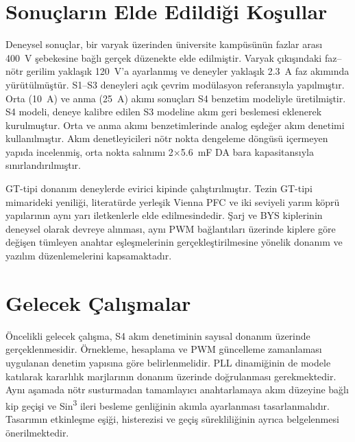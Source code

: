\section{Sonuçların Elde Edildiği Koşullar}
\label{sec:sonuc-kosullar}

Deneysel sonuçlar, bir varyak üzerinden üniversite kampüsünün fazlar arası \SI{400}{\volt} şebekesine bağlı gerçek düzenekte elde edilmiştir. Varyak çıkışındaki faz--nötr gerilim yaklaşık \SI{120}{\volt}'a ayarlanmış ve deneyler yaklaşık \SI{2.3}{\ampere} faz akımında yürütülmüştür. S1--S3 deneyleri açık çevrim modülasyon referansıyla yapılmıştır. Orta (\SI{10}{\ampere}) ve anma (\SI{25}{\ampere}) akımı sonuçları S4 benzetim modeliyle üretilmiştir. S4 modeli, deneye kalibre edilen S3 modeline akım geri beslemesi eklenerek kurulmuştur. Orta ve anma akımı benzetimlerinde analog eşdeğer akım denetimi kullanılmıştır. Akım denetleyicileri nötr nokta dengeleme döngüsü içermeyen yapıda incelenmiş, orta nokta salınımı 2$\times$\SI{5.6}{\milli\farad} DA bara kapasitansıyla sınırlandırılmıştır.

GT-tipi donanım deneylerde evirici kipinde çalıştırılmıştır. Tezin GT-tipi mimarideki yeniliği, literatürde yerleşik Vienna PFC ve iki seviyeli yarım köprü yapılarının aynı yarı iletkenlerle elde edilmesindedir. Şarj ve BYS kiplerinin deneysel olarak devreye alınması, aynı PWM bağlantıları üzerinde kiplere göre değişen tümleyen anahtar eşleşmelerinin gerçekleştirilmesine yönelik donanım ve yazılım düzenlemelerini kapsamaktadır.

\section{Gelecek Çalışmalar}
\label{sec:gelecek-calismalar}

Öncelikli gelecek çalışma, S4 akım denetiminin sayısal donanım üzerinde gerçeklenmesidir. Örnekleme, hesaplama ve PWM güncelleme zamanlaması uygulanan denetim yapısına göre belirlenmelidir. PLL dinamiğinin de modele katılarak kararlılık marjlarının donanım üzerinde doğrulanması gerekmektedir. Aynı aşamada nötr susturmadan tamamlayıcı anahtarlamaya akım düzeyine bağlı kip geçişi ve Sin\textsuperscript{3} ileri besleme genliğinin akımla ayarlanması tasarlanmalıdır. Tasarımın etkinleşme eşiği, histerezisi ve geçiş sürekliliğinin ayrıca belgelenmesi önerilmektedir.

